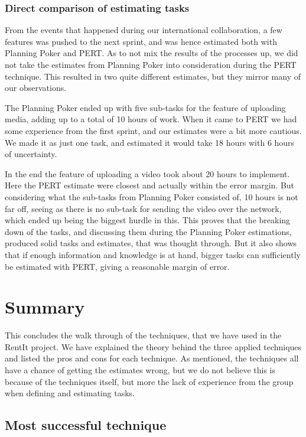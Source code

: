 \subsubsection{Direct comparison of estimating tasks}
From the events that happened during our international collaboration, a few features was pushed to the next sprint, and was hence estimated both with Planning Poker and PERT. As to not mix the results of the processes up, we did not take the estimates from Planning Poker into consideration during the PERT technique. This resulted in two quite different estimates, but they mirror many of our observations.

The Planning Poker ended up with five sub-tasks for the feature of uploading media, adding up to a total of 10 hours of work. When it came to PERT we had some experience from the first sprint, and our estimates were a bit more cautious. We made it as just one task, and estimated it would take 18 hours with 6 hours of uncertainty.

In the end the feature of uploading a video took about 20 hours to implement. Here the PERT estimate were closest and actually within the error margin. But considering what the sub-tasks from Planning Poker consisted of, 10 hours is not far off, seeing as there is no sub-task for sending the video over the network, which ended up being the biggest hurdle in this. This proves that the breaking down of the tasks, and discussing them during the Planning Poker estimations, produced solid tasks and estimates, that was thought through. But it also shows that if enough information and knowledge is at hand, bigger tasks can sufficiently be estimated with PERT, giving a reasonable margin of error. \\


\section{Summary}
This concludes the walk through of the techniques, that we have used in the RentIt project. We have explained the theory behind the three applied techniques and listed the pros and cons for each technique. As mentioned, the techniques all have a chance of getting the estimates wrong, but we do not believe this is because of the techniques itself, but more the lack of experience from the group when defining and estimating tasks. 
\subsection{Most successful technique}

















